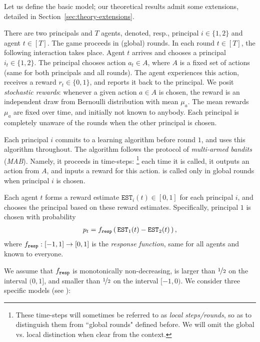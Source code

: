 
Let us define the basic model; our theoretical results admit some extensions, detailed in Section~\ref{sec:theory-extensions}.

 There are two principals and $T$ agents,
denoted, resp., principal $i\in \{1,2\}$ and agent $t\in [T]$. The game proceeds in (global) rounds. In each round $t\in [T]$, the following  interaction takes place. Agent $t$ arrives and chooses a principal $i_t\in \{1,2\}$. The principal chooses action $a_t\in A$, where $A$ is a fixed set of actions (same for both principals and all rounds). The agent experiences this action, receives a reward $r_t\in \{ 0,1\}$, and reports it back to the principal. We posit \emph{stochastic rewards}: whenever a given action $a\in A$ is chosen, the reward is an independent draw from Bernoulli distribution with mean $\mu_a$. The mean rewards $\mu_a$ are fixed over time, and initially not known to anybody. Each principal is completely unaware of the rounds when the other principal is chosen.

Each principal $i$ commits to a learning algorithm \alg[i] before round $1$, and uses this algorithm throughout. The algorithm follows the protocol of \emph{multi-armed bandits} (\emph{MAB}). Namely, it proceeds in time-steps:%
\footnote{These time-steps will sometimes be referred to as \emph{local steps/rounds}, so as to distinguish them from ``global rounds" defined before. We will omit the global vs. local distinction when clear from the context.} each time it is called, it outputs an action from $A$, and inputs a reward for this action. \alg[i] is called only in global rounds when principal $i$ is chosen.

\newcommand{\est}{\mathtt{EST}}

 Each agent $t$ forms a reward estimate $\est_i(t)\in [0,1]$ for each principal $i$, and chooses the principal based on these reward estimates. Specifically, principal $1$ is chosen with probability
\begin{align}
p_t = \respF\rbr{ \est_1(t) - \est_2(t) },
\end{align}
where $f_{\mathtt{resp}}:[-1,1]\to [0,1]$ is the \emph{response function}, same for all agents and known to everyone.

We assume that $f_{\mathtt{resp}}$ is monotonically non-decreasing, is larger than $\nicefrac12$ on the interval $(0,1]$, and smaller than $\nicefrac12$ on the interval $[-1,0)$. We consider three specific models (see ):

